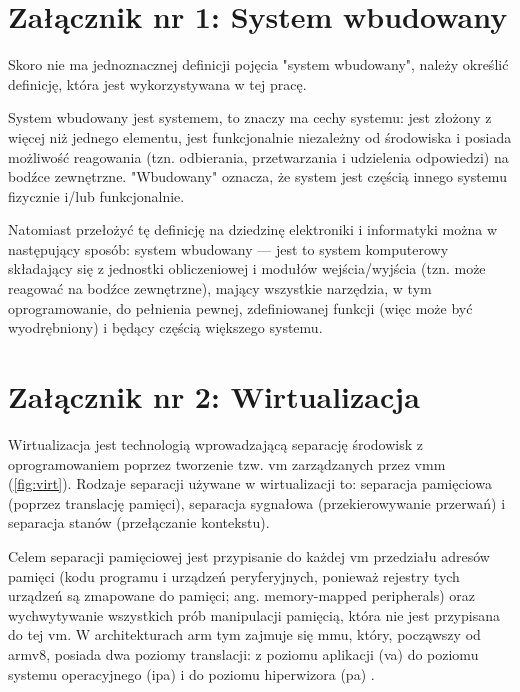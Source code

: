 \documentclass[../main]{subfiles}
\begin{document}
\section*{Załącznik nr 1: System wbudowany}\label{sec:zalacznik-1}

Skoro nie ma jednoznacznej definicji pojęcia "system wbudowany", należy określić definicję, która jest wykorzystywana w tej pracę.

System wbudowany jest systemem, to znaczy ma cechy systemu: jest złożony z więcej niż jednego elementu, jest funkcjonalnie niezależny od środowiska i posiada możliwość reagowania (tzn. odbierania, przetwarzania i udzielenia odpowiedzi) na bodźce zewnętrzne. "Wbudowany" oznacza, że system jest częścią innego systemu fizycznie i/lub funkcjonalnie.

Natomiast przełożyć tę definicję na dziedzinę elektroniki i informatyki można w następujący sposób: system wbudowany — jest to system komputerowy składający się z jednostki obliczeniowej i modułów wejścia/wyjścia (tzn. może reagować na bodźce zewnętrzne), mający wszystkie narzędzia, w tym oprogramowanie, do pełnienia pewnej, zdefiniowanej funkcji (więc może być wyodrębniony) i będący częścią większego systemu.

\section*{Załącznik nr 2: Wirtualizacja}\label{sec:zalacznik-2}

Wirtualizacja jest technologią wprowadzającą separację środowisk z oprogramowaniem poprzez tworzenie tzw. \acrshort{vm} zarządzanych przez \acrshort{vmm} (\cref{fig:virt}). Rodzaje separacji używane w wirtualizacji to: separacja pamięciowa (poprzez translację pamięci), separacja sygnałowa (przekierowywanie przerwań) i separacja stanów (przełączanie kontekstu).

Celem separacji pamięciowej jest przypisanie do każdej \acrshort{vm} przedziału adresów pamięci (kodu programu i urządzeń peryferyjnych, ponieważ rejestry tych urządzeń są zmapowane do pamięci; ang. memory-mapped peripherals) oraz wychwytywanie wszystkich prób manipulacji pamięcią, która nie jest przypisana do tej \acrshort{vm}. W architekturach \acrshort{arm} tym zajmuje się \acrshort{mmu}, który, począwszy od \acrshort{arm}v8, posiada dwa poziomy translacji: z poziomu aplikacji (\acrshort{va}) do poziomu systemu operacyjnego (\acrshort{ipa}) i do poziomu hiperwizora (\acrshort{pa}) \cite{armv8amemtranslation}.
\end{document}
